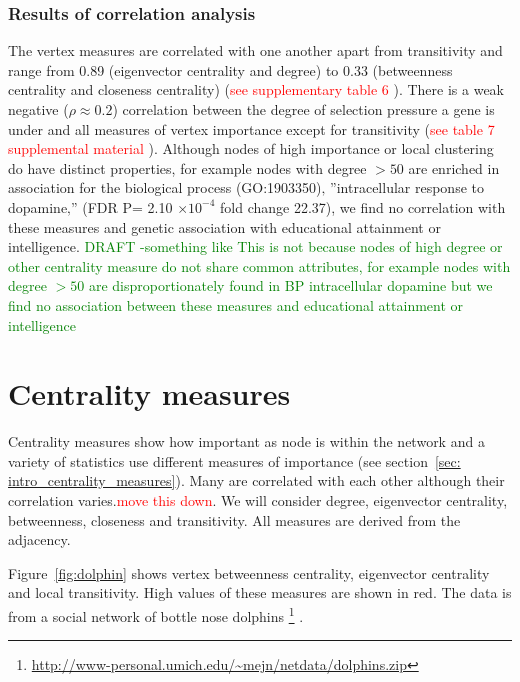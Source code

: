 \subsubsection{Results of correlation analysis}
The vertex measures are correlated with one another apart from transitivity and range from 0.89 (eigenvector centrality and degree) to 0.33 (betweenness centrality and closeness centrality) (\textcolor{red}{see supplementary table 6} ).
There is a weak negative ($\rho \approx 0.2$) correlation between 
the degree of selection pressure a gene is under and all measures of vertex importance except for transitivity (\textcolor{red}{see table 7 supplemental material} ).
Although nodes of high importance or local clustering do have distinct properties, for example nodes with degree $> 50$ are enriched in association for the biological process (GO:1903350)‚ ”intracellular response to dopamine‚” (FDR P= 2.10 $\times 10^{-4}$ fold change 22.37), we find no correlation with these measures and genetic association with educational attainment or intelligence. 
\textcolor{green}{DRAFT -something like This is not because nodes of high degree or other centrality measure do not share common attributes, for example nodes with degree $>50$ are disproportionately found in BP intracellular dopamine but we find no association between these measures and educational attainment or intelligence}

\section{Centrality measures}
Centrality measures show how important as node is within the network and a variety of statistics use different measures of importance (see section~\ref{sec: intro_centrality_measures}). Many are correlated with each other although their correlation varies.\textcolor{red}{move this down}. We will consider degree, eigenvector centrality, betweenness, closeness and transitivity. All measures are derived from the adjacency.

Figure~\ref{fig:dolphin} shows vertex betweenness centrality, eigenvector centrality and local transitivity. High values of these measures are shown in red. The data is from a social network of bottle nose dolphins \footnote{\url{http://www-personal.umich.edu/~mejn/netdata/dolphins.zip}} \cite{lusseau2003bottlenose} .


